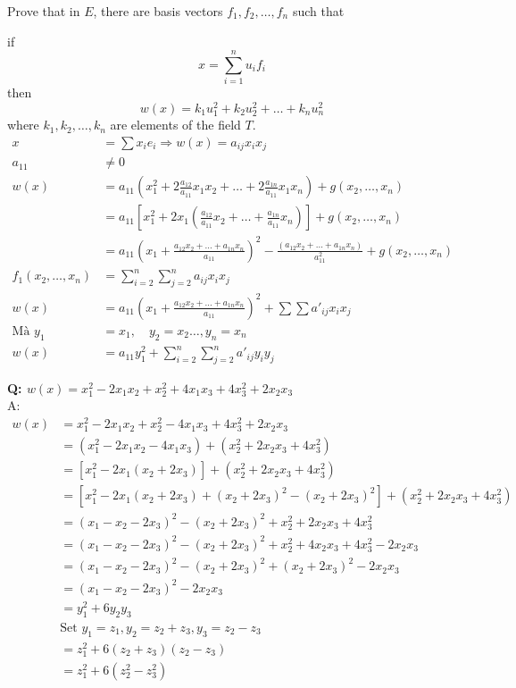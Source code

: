 Prove that in $E$, there are basis vectors $f_1, f_2, \ldots, f_n$ such that

if
\begin{equation*}
    x = \sum_{i=1}^n u_i f_i
\end{equation*}
then
\[
w(x) = k_1 u_1^2 + k_2 u_2^2 + \ldots + k_n u_n^2
\]
where $k_1, k_2, \ldots, k_n$ are elements of the field $T$.
\begin{align*}
    x &= \sum x_i e_i \Rightarrow w(x) = a_{ij}x_ix_j\\
    a_{11} &\neq 0 \\
    w(x) &= a_{11}\left(x_1^2 + 2\frac{a_{12}}{a_{11}}x_1x_2 + \ldots + 2\frac{a_{1n}}{a_{11}}x_1x_n \right) + g(x_2, \ldots, x_n)\\
    &= a_{11}\left[x_1^2 + 2x_1\left(\frac{a_{12}}{a_{11}}x_2 + \ldots + \frac{a_{1n}}{a_{11}}x_n\right)\right] + g(x_2, \ldots, x_n)\\
    &= a_{11}\left(x_1 + \frac{a_{12}x_2 + \ldots + a_{1n}x_n}{a_{11}}\right)^2 - \frac{(a_{12}x_2 + \ldots + a_{1n}x_n)}{a_{11}^2}+ g(x_2, \ldots, x_n)\\
    f_1(x_2, \ldots, x_n) &= \sum_{i=2}^n \sum_{j=2}^n a_{ij}x_ix_j\\
    w(x) &= a_{11}\left(x_1 + \frac{a_{12}x_2 + \ldots + a_{1n}x_n}{a_{11}}\right)^2 + \sum\sum a'_{ij}x_ix_j\\
    \textrm{Mà }y_1 &= x_1, \quad y_2 = x_2  \ldots, y_n = x_n\\
    w(x) &= a_{11}y_1^2 + \sum^n_{i=2} \sum^n_{j=2} a'_{ij}y_iy_j
\end{align*}

\pagebreak
\textbf{Q: $w(x) = x_1^2 - 2x_1x_2 + x_2^2+4x_1x_3 + 4x_3^2 + 2x_2x_3$}\\
A: \begin{align*}
    w(x) &= x_1^2 - 2x_1x_2 + x_2^2 - 4x_1x_3 + 4x_3^2 + 2x_2x_3\\
    &= (x_1^2 - 2x_1x_2 - 4x_1x_3) + (x_2^2 + 2x_2x_3 + 4x_3^2)\\
    &= [x_1^2 - 2x_1(x_2 + 2x_3)] + (x_2^2 + 2x_2x_3 + 4x_3^2)\\
    &= [x_1^2 - 2x_1(x_2 + 2x_3) + (x_2 + 2x_3)^2 - (x_2 + 2x_3)^2] + (x_2^2 + 2x_2x_3 + 4x_3^2)\\
    &= (x_1 - x_2 - 2x_3)^2 - (x_2 + 2x_3)^2 + x_2^2 + 2x_2x_3 + 4x_3^2\\
    &= (x_1 - x_2 - 2x_3)^2 - (x_2 + 2x_3)^2 + x_2^2 + 4x_2x_3 + 4x_3^2 - 2x_2x_3\\
    &= (x_1 - x_2 - 2x_3)^2 - (x_2 + 2x_3)^2 + (x_2 + 2x_3)^2 - 2x_2x_3\\
    &= (x_1 - x_2 - 2x_3)^2 - 2x_2x_3\\
    &= y_1^2 + 6y_2y_3\\
    &\textrm{Set } y_1 = z_1, y_2 = z_2 + z_3, y_3 = z_2 - z_3\\
    &= z_1^2 + 6(z_2 + z_3)(z_2 - z_3)\\
    &= z_1^2 + 6(z_2^2 - z_3^2)
\end{align*}

